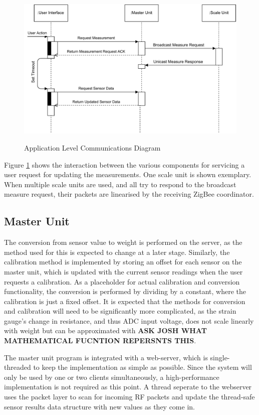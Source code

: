 \begin{figure}
\includegraphics[width=\textwidth]{images/communications-diagram.pdf}
\label{communications-diagram}
\caption{Application Level Communications Diagram}
\end{figure}

Figure \ref{communications-diagram} shows the interaction between the various components for servicing a user request for updating the measurements. One scale unit is shown exemplary. When multiple scale units are used, and all try to respond to the broadcast measure request, their packets are linearised by the receiving ZigBee coordinator.

\subsection{Master Unit}
The conversion from sensor value to weight is performed on the server, as the method used for this is expected to change at a later stage. Similarly, the calibration method is implemented by storing an offset for each sensor on the master unit, which is updated with the current sensor readings when the user requests a calibration. As a placeholder for actual calibration and conversion functionality, the conversion is performed by dividing by a constant, where the calibration is just a fixed offset. It is expected that the methods for conversion and calibration will need to be significantly more complicated, as the strain gauge's change in resistance, and thus ADC input voltage, does not scale linearly with weight but can be approximated with \textbf{ASK JOSH WHAT MATHEMATICAL FUCNTION REPERSNTS THIS}.

The master unit program is integrated with a web-server, which is single-threaded to keep the implementation as simple as possible. Since the system will only be used by one or two clients simultaneously, a high-performance implementation is not required as this point. A thread seperate to the webserver uses the packet layer to scan for incoming RF packets and update the thread-safe sensor results data structure with new values as they come in.

